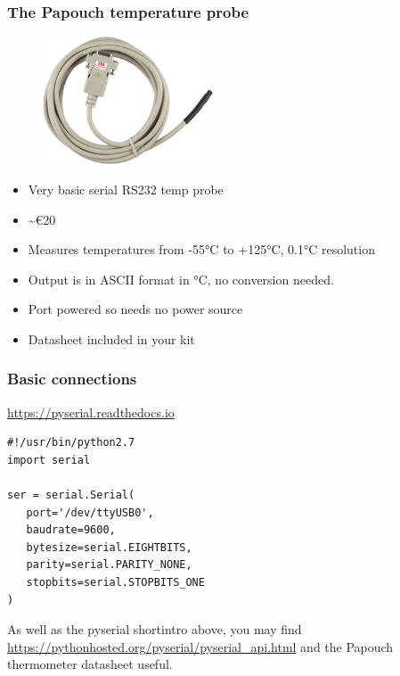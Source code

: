 \documentclass[aspectratio=1610,9pt]{beamer} %
\begin{document}
\begin{frame}
\frametitle{The Papouch temperature probe}

\begin{figure}
\vspace{-3cm}
\includegraphics[width=0.45\textwidth]{papouchprobe.jpeg}
\end{figure}
\par
\begin{minipage}{0.45\textwidth}
\begin{itemize}
\itemsep1pt\parskip0pt
\item
  Very basic serial RS232 temp probe
\item
  \textasciitilde{}\euro{}20
\item
  Measures temperatures from -55°C to +125°C, 0.1°C resolution
\item
  Output is in ASCII format in °C, no conversion needed.
\item
  Port powered so needs no power source
\item
  Datasheet included in your kit
\end{itemize}
\end{minipage}

\end{frame}
\begin{frame}[fragile=singleslide]
\frametitle{Basic connections}

\href{https://pyserial.readthedocs.io}{https://pyserial.readthedocs.io}

\begin{verbatim}
#!/usr/bin/python2.7
import serial

ser = serial.Serial(
   port='/dev/ttyUSB0',
   baudrate=9600,
   bytesize=serial.EIGHTBITS,
   parity=serial.PARITY_NONE,
   stopbits=serial.STOPBITS_ONE
)
\end{verbatim}

As well as the pyserial shortintro above, you may find
\url{https://pythonhosted.org/pyserial/pyserial_api.html}
and the Papouch thermometer datasheet useful.

\end{frame}
\end{document}
